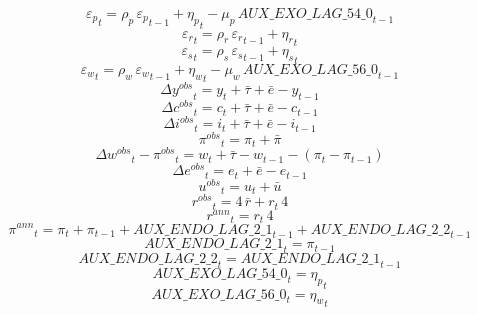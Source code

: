 \begin{dmath}
{{\varepsilon_p}}_{t}={{\rho_p}}\, {{\varepsilon_p}}_{t-1}+{{\eta_p}}_{t}-{{\mu_p}}\, {AUX\_EXO\_LAG\_54\_0}_{t-1}
\end{dmath}
\begin{dmath}
{{\varepsilon_r}}_{t}={{\rho_r}}\, {{\varepsilon_r}}_{t-1}+{{\eta_r}}_{t}
\end{dmath}
\begin{dmath}
{{\varepsilon_s}}_{t}={{\rho_s}}\, {{\varepsilon_s}}_{t-1}+{{\eta_s}}_{t}
\end{dmath}
\begin{dmath}
{{\varepsilon_w}}_{t}={{\rho_w}}\, {{\varepsilon_w}}_{t-1}+{{\eta_w}}_{t}-{{\mu_w}}\, {AUX\_EXO\_LAG\_56\_0}_{t-1}
\end{dmath}
\begin{dmath}
{{\Delta y^{obs}}}_{t}={{y}}_{t}+{{\bar{\tau}}}+{{\bar{e}}}-{{y}}_{t-1}
\end{dmath}
\begin{dmath}
{{\Delta c^{obs}}}_{t}={{c}}_{t}+{{\bar{\tau}}}+{{\bar{e}}}-{{c}}_{t-1}
\end{dmath}
\begin{dmath}
{{\Delta i^{obs}}}_{t}={{i}}_{t}+{{\bar{\tau}}}+{{\bar{e}}}-{{i}}_{t-1}
\end{dmath}
\begin{dmath}
{{\pi^{obs}}}_{t}={{\pi}}_{t}+{{\bar{\pi}}}
\end{dmath}
\begin{dmath}
{{\Delta w^{obs}}}_{t}-{{\pi^{obs}}}_{t}={{w}}_{t}+{{\bar{\tau}}}-{{w}}_{t-1}-\left({{\pi}}_{t}-{{\pi}}_{t-1}\right)
\end{dmath}
\begin{dmath}
{{\Delta e^{obs}}}_{t}={{e}}_{t}+{{\bar{e}}}-{{e}}_{t-1}
\end{dmath}
\begin{dmath}
{{u^{obs}}}_{t}={{u}}_{t}+{{\bar{u}}}
\end{dmath}
\begin{dmath}
{{r^{obs}}}_{t}=4\, {{\bar{r}}}+{{r}}_{t}\, 4
\end{dmath}
\begin{dmath}
{{r^{ann}}}_{t}={{r}}_{t}\, 4
\end{dmath}
\begin{dmath}
{{\pi^{ann}}}_{t}={{\pi}}_{t}+{{\pi}}_{t-1}+{AUX\_ENDO\_LAG\_2\_1}_{t-1}+{AUX\_ENDO\_LAG\_2\_2}_{t-1}
\end{dmath}
\begin{dmath}
{AUX\_ENDO\_LAG\_2\_1}_{t}={{\pi}}_{t-1}
\end{dmath}
\begin{dmath}
{AUX\_ENDO\_LAG\_2\_2}_{t}={AUX\_ENDO\_LAG\_2\_1}_{t-1}
\end{dmath}
\begin{dmath}
{AUX\_EXO\_LAG\_54\_0}_{t}={{\eta_p}}_{t}
\end{dmath}
\begin{dmath}
{AUX\_EXO\_LAG\_56\_0}_{t}={{\eta_w}}_{t}
\end{dmath}

